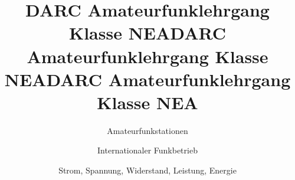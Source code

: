 \documentclass[aspectratio = 169]{beamer}
\begin{document}
\title{DARC Amateurfunklehrgang Klasse NEA}
\author{Amateurfunkstationen}
\begin{frame}
\maketitle
\end{frame}















\title{DARC Amateurfunklehrgang Klasse NEA}
\author{Internationaler Funkbetrieb}
\begin{frame}
\maketitle
\end{frame}





\title{DARC Amateurfunklehrgang Klasse NEA}
\author{Strom, Spannung, Widerstand, Leistung, Energie}
\begin{frame}
\maketitle
\end{frame}






























\end{document}
